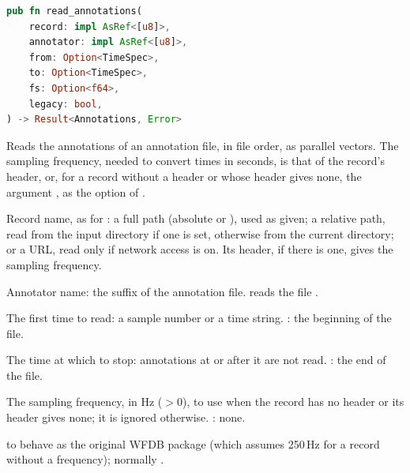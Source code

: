 \begin{lstlisting}[language=Rust,style=signature]
pub fn read_annotations(
    record: impl AsRef<[u8]>,
    annotator: impl AsRef<[u8]>,
    from: Option<TimeSpec>,
    to: Option<TimeSpec>,
    fs: Option<f64>,
    legacy: bool,
) -> Result<Annotations, Error>
\end{lstlisting}
Reads the annotations of an annotation file, in file order, as parallel vectors. The
sampling frequency, needed to convert times in seconds, is that of the record's header,
or, for a record without a header or whose header gives none, the argument , as
the option  of .
\begin{params}
\item[record] Record name, as for : a full path (absolute or
  \code{\textasciitilde}), used as given; a relative path, read from the input directory
  if one is set, otherwise from the current directory; or a URL, read only if network
  access is on. Its header, if there is one, gives the sampling frequency.
\item[annotator] Annotator name: the suffix of the annotation file.  reads the
  file .
\item[from] The first time to read: a sample number or a time string. : the
  beginning of the file.
\item[to] The time at which to stop: annotations at or after it are not read.
  : the end of the file.
\item[fs] The sampling frequency, in Hz ($> 0$), to use when the record has no header or
  its header gives none; it is ignored otherwise. : none.
\item[legacy]  to behave as the original WFDB package (which assumes 250\,Hz
  for a record without a frequency); normally .
\end{params}
